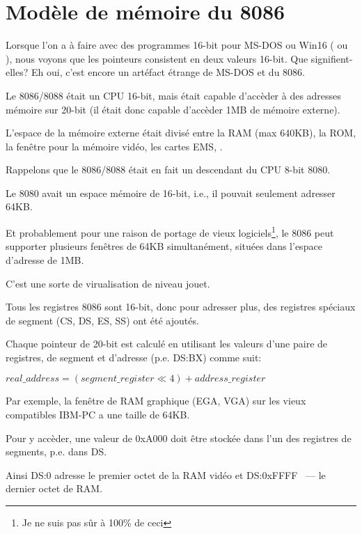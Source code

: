 \section{Modèle de mémoire du 8086}
\label{8086_memory_model}

Lorsque l'on a à faire avec des programmes 16-bit pour MS-DOS ou Win16
( ou ),
nous voyons que les pointeurs consistent en deux valeurs 16-bit.
Que signifient-elles? Eh oui, c'est encore un artéfact étrange de MS-DOS et du 8086.

Le 8086/8088 était un CPU 16-bit, mais était capable d'accèder à des adresses mémoire
sur 20-bit (il était donc capable d'accèder 1MB de mémoire externe).

L'espace de la mémoire externe était divisé entre la \ac{RAM} (max 640KB), la \ac{ROM},
la fenêtre pour la mémoire vidéo, les cartes EMS, \etc{}.

Rappelons que le 8086/8088 était en fait un descendant du CPU 8-bit 8080.

Le 8080 avait un espace mémoire de 16-bit, i.e., il pouvait seulement adresser 64KB.

Et probablement pour une raison de portage de vieux logiciels\footnote{Je ne suis
pas sûr à 100\% de ceci}, le 8086 peut supporter plusieurs fenêtres de 64KB simultanément,
situées dans l'espace d'adresse de 1MB.

C'est une sorte de virualisation de niveau jouet.

Tous les registres 8086 sont 16-bit, donc pour adresser plus, des registres spéciaux
de segment (CS, DS, ES, SS) ont été ajoutés.

Chaque pointeur de 20-bit est calculé en utilisant les valeurs d'une paire de registres,
de segment et d'adresse (p.e. DS:BX) comme suit:

\begin{center}
$real\_address = (segment\_register \ll 4) + address\_register$
\end{center}

Par exemple, la fenêtre de \ac{RAM} graphique (\ac{EGA}, \ac{VGA}) sur les vieux
compatibles IBM-PC a une taille de 64KB.

Pour y accèder, une valeur de 0xA000 doit être stockée dans l'un des registres de
segments, p.e. dans DS.

Ainsi DS:0 adresse le premier octet de la \ac{RAM} vidéo et DS:0xFFFF ~--- le dernier
octet de RAM.

